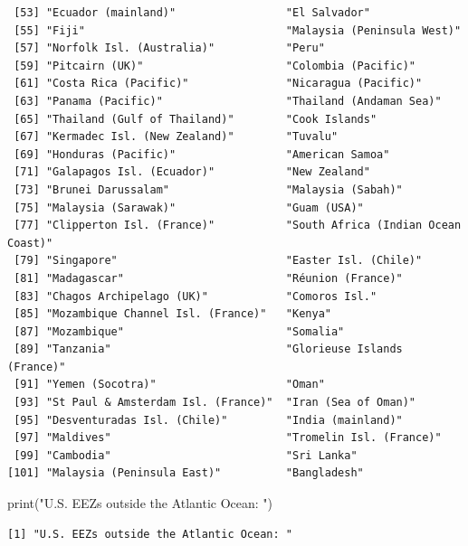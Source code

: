 \documentclass[
]{article}
\newenvironment{Shaded}{\begin{snugshade}}{\end{snugshade}}
\newcommand{\FunctionTok}[1]{\textcolor[rgb]{0.28,0.35,0.67}{#1}}
\newcommand{\NormalTok}[1]{\textcolor[rgb]{0.00,0.23,0.31}{#1}}
\newcommand{\StringTok}[1]{\textcolor[rgb]{0.13,0.47,0.30}{#1}}
\begin{document}
\begin{verbatim}
 [53] "Ecuador (mainland)"                 "El Salvador"                       
 [55] "Fiji"                               "Malaysia (Peninsula West)"         
 [57] "Norfolk Isl. (Australia)"           "Peru"                              
 [59] "Pitcairn (UK)"                      "Colombia (Pacific)"                
 [61] "Costa Rica (Pacific)"               "Nicaragua (Pacific)"               
 [63] "Panama (Pacific)"                   "Thailand (Andaman Sea)"            
 [65] "Thailand (Gulf of Thailand)"        "Cook Islands"                      
 [67] "Kermadec Isl. (New Zealand)"        "Tuvalu"                            
 [69] "Honduras (Pacific)"                 "American Samoa"                    
 [71] "Galapagos Isl. (Ecuador)"           "New Zealand"                       
 [73] "Brunei Darussalam"                  "Malaysia (Sabah)"                  
 [75] "Malaysia (Sarawak)"                 "Guam (USA)"                        
 [77] "Clipperton Isl. (France)"           "South Africa (Indian Ocean Coast)" 
 [79] "Singapore"                          "Easter Isl. (Chile)"               
 [81] "Madagascar"                         "Réunion (France)"                  
 [83] "Chagos Archipelago (UK)"            "Comoros Isl."                      
 [85] "Mozambique Channel Isl. (France)"   "Kenya"                             
 [87] "Mozambique"                         "Somalia"                           
 [89] "Tanzania"                           "Glorieuse Islands (France)"        
 [91] "Yemen (Socotra)"                    "Oman"                              
 [93] "St Paul & Amsterdam Isl. (France)"  "Iran (Sea of Oman)"                
 [95] "Desventuradas Isl. (Chile)"         "India (mainland)"                  
 [97] "Maldives"                           "Tromelin Isl. (France)"            
 [99] "Cambodia"                           "Sri Lanka"                         
[101] "Malaysia (Peninsula East)"          "Bangladesh"                        
\end{verbatim}

\begin{Shaded}
\begin{Highlighting}[]
\FunctionTok{print}\NormalTok{(}\StringTok{"U.S. EEZs outside the Atlantic Ocean: "}\NormalTok{)}
\end{Highlighting}
\end{Shaded}

\begin{verbatim}
[1] "U.S. EEZs outside the Atlantic Ocean: "
\end{verbatim}
\end{document}
